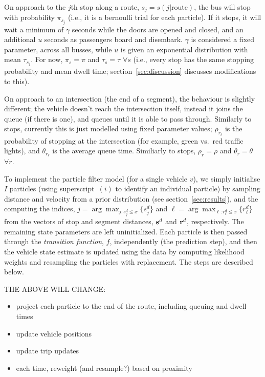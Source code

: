 \documentclass[draftcls,a4paper,onecolumn]{IEEEtran}\usepackage[]{graphicx}\usepackage[]{color}
\begin{document}
On approach to the $j$th stop along a route, 
$s_j = s(j | \text{route})$,
the bus will stop with probability $\pi_{s_j}$ 
(i.e., it is a bernoulli trial for each particle).
If it stops, it will wait a minimum of $\gamma$ seconds 
while the doors are opened and closed,
and an additional $u$ seconds as passengers board and disembark.
$\gamma$ is considered a fixed parameter, across all busses, 
while $u$ is given an exponential distribution with mean $\tau_{s_j}$.
For now, $\pi_s = \pi$ and $\tau_s = \tau$ $\forall s$
(i.e., every stop has the same stopping probability and mean dwell time; 
section~\ref{sec:discussion} discusses modifications to this).

On approach to an intersection (the end of a segment),
the behaviour is slightly different;
the vehicle doesn't reach the intersection itself, instead it joins the queue
(if there is one), and queues until it is able to pass through.
Similarly to stops, currently this is just modelled using fixed parameter values;
$\rho_{r_\ell}$ is the probability of stopping at the intersection
(for example, green vs.\ red traffic lights),
and $\theta_{r_\ell}$ is the average queue time.
Similiarly to stops, $\rho_r = \rho$ and $\theta_r = \theta$ $\forall r$.


To implement the particle filter model (for a single vehicle $v$), 
we simply initialise $I$ particles 
(using superscript~${(i)}$ to identify an individual particle)
by sampling distance and velocity from a prior distribution
(see section~\ref{sec:results}), 
and the computing the indices,
$j = \arg\max_{j:s_j^d \leq x} \{s_j^d\}$ 
and $\ell = \arg\max_{\ell:r_\ell^d \leq x} \{r_\ell^d\}$ from the 
vectors of stop and segment distances, $\mathbf{s}^d$ and $\mathbf{r}^d$, respectively.
The remaining state parameters are left uninitialized.
Each particle is then passed through the \emph{transition function}, $f$,
independently (the prediction step),
and then the vehicle state estimate is updated 
using the data by computing likelihood weights
and resampling the particles with replacement.
The steps are described below.

THE ABOVE WILL CHANGE:
\begin{itemize}
\item project each particle to the end of the route,
  including queuing and dwell times
\item update vehicle positions
\item update trip updates
\item each time, reweight (and resample?) based on proximity
\end{itemize}
\end{document}
